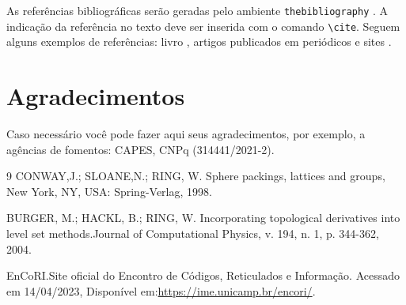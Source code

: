 \documentclass{semat}
\begin{document}
As referências bibliográficas serão geradas pelo ambiente \verb+thebibliography+ . A indicação da referência no texto deve ser inserida com o comando \verb+\cite+. Seguem alguns exemplos de referências: livro \cite{conway2013sphere}, artigos publicados em periódicos \cite{burger2004derivatives} e sites \cite{EnCoRI}. 


\vspace{1.5em}


\section*{Agradecimentos} %
Caso necessário você pode fazer aqui seus agradecimentos, por exemplo, a agências de fomentos: CAPES, CNPq (314441/2021-2).



\begin{thebibliography}{9}
CONWAY,J.; SLOANE,N.; RING, W. 
Sphere packings, lattices and groups,
  New York, NY, USA: Spring-Verlag, 1998.

BURGER, M.; HACKL, B.; RING, W. Incorporating topological derivatives into level set methods.Journal of Computational Physics, v. 194, n. 1, p. 344-362, 2004.

  EnCoRI.Site oficial do Encontro de Códigos, Reticulados e Informação. Acessado em 14/04/2023, Disponível em:\url{https://ime.unicamp.br/encori/}.
\end{thebibliography}
\end{document}
